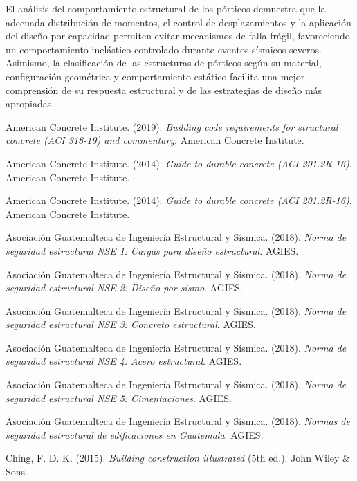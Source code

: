 \documentclass[14pt,letterpaper]{extarticle}
\begin{document}
	El análisis del comportamiento estructural de los pórticos demuestra que la adecuada distribución de momentos, el control de desplazamientos y la aplicación del diseño por capacidad permiten evitar mecanismos de falla frágil, favoreciendo un comportamiento inelástico controlado durante eventos sísmicos severos. Asimismo, la clasificación de las estructuras de pórticos según su material, configuración geométrica y comportamiento estático facilita una mejor comprensión de su respuesta estructural y de las estrategias de diseño más apropiadas.
	
	\newpage

	
	
\renewcommand{\refname}{Referencias}




\renewcommand{\refname}{Referencias}

American Concrete Institute. (2019). \textit{Building code requirements for structural concrete (ACI 318-19) and commentary}. American Concrete Institute.


American Concrete Institute. (2014). \textit{Guide to durable concrete (ACI 201.2R-16)}. American Concrete Institute.





American Concrete Institute. (2014). \textit{Guide to durable concrete (ACI 201.2R-16)}. American Concrete Institute.

Asociación Guatemalteca de Ingeniería Estructural y Sísmica. (2018). \textit{Norma de seguridad estructural NSE 1: Cargas para diseño estructural}. AGIES.

Asociación Guatemalteca de Ingeniería Estructural y Sísmica. (2018). \textit{Norma de seguridad estructural NSE 2: Diseño por sismo}. AGIES.

Asociación Guatemalteca de Ingeniería Estructural y Sísmica. (2018). \textit{Norma de seguridad estructural NSE 3: Concreto estructural}. AGIES.

Asociación Guatemalteca de Ingeniería Estructural y Sísmica. (2018). \textit{Norma de seguridad estructural NSE 4: Acero estructural}. AGIES.

Asociación Guatemalteca de Ingeniería Estructural y Sísmica. (2018). \textit{Norma de seguridad estructural NSE 5: Cimentaciones}. AGIES.

Asociación Guatemalteca de Ingeniería Estructural y Sísmica. (2018). \textit{Normas de seguridad estructural de edificaciones en Guatemala}. AGIES.

Ching, F. D. K. (2015). \textit{Building construction illustrated} (5th ed.). John Wiley \& Sons.

	
	
	
		
	
		
	
	
	
\end{document}
